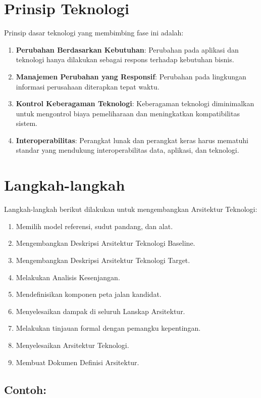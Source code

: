 \section{Prinsip Teknologi}
Prinsip dasar teknologi yang membimbing fase ini adalah:
\begin{enumerate}
	\item \textbf{Perubahan Berdasarkan Kebutuhan}: Perubahan pada aplikasi dan teknologi hanya dilakukan sebagai respons terhadap kebutuhan bisnis.
	\item \textbf{Manajemen Perubahan yang Responsif}: Perubahan pada lingkungan informasi perusahaan diterapkan tepat waktu.
	\item \textbf{Kontrol Keberagaman Teknologi}: Keberagaman teknologi diminimalkan untuk mengontrol biaya pemeliharaan dan meningkatkan kompatibilitas sistem.
	\item \textbf{Interoperabilitas}: Perangkat lunak dan perangkat keras harus mematuhi standar yang mendukung interoperabilitas data, aplikasi, dan teknologi.
\end{enumerate}

\section{Langkah-langkah}
Langkah-langkah berikut dilakukan untuk mengembangkan Arsitektur Teknologi:
\begin{enumerate}
	\item Memilih model referensi, sudut pandang, dan alat.
	\item Mengembangkan Deskripsi Arsitektur Teknologi Baseline.
	\item Mengembangkan Deskripsi Arsitektur Teknologi Target.
	\item Melakukan Analisis Kesenjangan.
	\item Mendefinisikan komponen peta jalan kandidat.
	\item Menyelesaikan dampak di seluruh Lanskap Arsitektur.
	\item Melakukan tinjauan formal dengan pemangku kepentingan.
	\item Menyelesaikan Arsitektur Teknologi.
	\item Membuat Dokumen Definisi Arsitektur.
\end{enumerate}

\subsection*{Contoh:}

